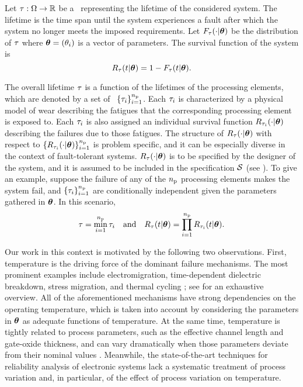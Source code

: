 Let $\tau: \Omega \to \mathbb{R}$ be a \rv\ representing the lifetime of the considered system.
The lifetime is the time span until the system experiences a fault after which the system no longer meets the imposed requirements.
Let $F_\tau(\cdot | \bm{\theta})$ be the distribution of $\tau$ where $\bm{\theta} = (\theta_i)$ is a vector of parameters.
The survival function of the system is
\[
  R_\tau(t | \bm{\theta}) = 1 - F_\tau(t | \bm{\theta}).
\]

The overall lifetime $\tau$ is a function of the lifetimes of the processing elements, which are denoted by a set of \rvs\ $\{ \tau_i \}_{i = 1}^{n_\text{p}}$.
Each $\tau_i$ is characterized by a physical model of wear \cite{jedec} describing the fatigues that the corresponding processing element is exposed to.
Each $\tau_i$ is also assigned an individual survival function $R_{\tau_i}(\cdot | \bm{\theta})$ describing the failures due to those fatigues.
The structure of $R_\tau(\cdot | \bm{\theta})$ with respect to $\{ R_{\tau_i}(\cdot | \bm{\theta}) \}_{i = 1}^{n_\text{p}}$ is problem specific, and it can be especially diverse in the context of fault-tolerant systems.
$R_\tau(\cdot | \bm{\theta})$ is to be specified by the designer of the system, and it is assumed to be included in the specification $\mathcal{S}$ (see ).
To give an example, suppose the failure of any of the ${n_\text{p}}$ processing elements makes the system fail, and $\{ \tau_i \}_{i = 1}^{n_\text{p}}$ are conditionally independent given the parameters gathered in $\bm{\theta}$.
In this scenario,
\begin{equation} \elab{reliability-model}
  \T = \min_{i = 1}^\nprocs \T_i \hspace{1em} \text{and} \hspace{1em} \survival_\T(\t | \pvw) = \prod_{i = 1}^\nprocs \survival_{\T_i}(\t | \pvw).
\end{equation}

Our work in this context is motivated by the following two observations.
First, temperature is the driving force of the dominant failure mechanisms.
The most prominent examples include electromigration, time-dependent dielectric breakdown, stress migration, and thermal cycling \cite{xiang2010}; see \cite{jedec} for an exhaustive overview.
All of the aforementioned mechanisms have strong dependencies on the operating temperature, which is taken into account by considering the parameters in $\bm{\theta}$ as adequate functions of temperature.
At the same time, temperature is tightly related to process parameters, such as the effective channel length and gate-oxide thickness, and can vary dramatically when those parameters deviate from their nominal values \cite{ukhov2014, juan2012}.
Meanwhile, the state-of-the-art techniques for reliability analysis of electronic systems lack a systematic treatment of process variation and, in particular, of the effect of process variation on temperature.

